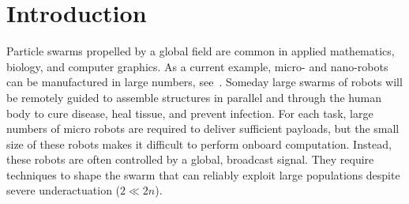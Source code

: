 \section{Introduction}\label{sec:Intro}
Particle swarms propelled by a global field are common in applied mathematics, biology, and computer graphics. 
As a current example, micro- and nano-robots can be manufactured in large numbers, see~\cite{Chowdhury2015,martel2014computer,kim2015imparting,Donald2013,Ghosh2009,Ou2013,qiu2015magnetic}.
Someday large swarms of robots will be remotely guided
to assemble structures in parallel and 
 through the human body to cure disease, heal tissue, and prevent infection. %
 For each task, large numbers of micro robots are required to deliver sufficient payloads, but the small size of these robots makes it difficult to perform onboard computation.  Instead, these robots are often controlled by a global, broadcast signal. 
They require techniques to shape the swarm that can reliably exploit large populations despite severe underactuation ($2 \ll2n$).  
 

